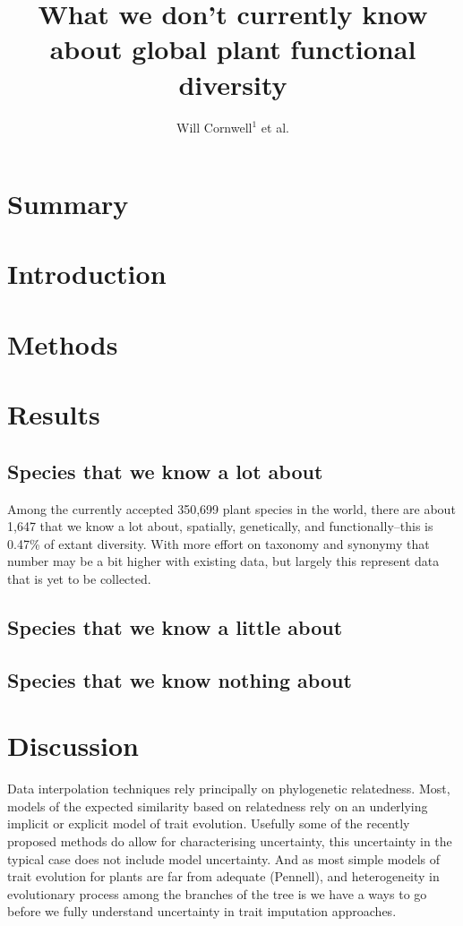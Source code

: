 \documentclass[a4paper,11pt]{article}
\title{What we don't currently know about global plant functional diversity}
\author{
Will Cornwell$^1$
et al.}
\affiliation{
*final list and order undecided\\
$^1$ University of NSW\\
}
\date{}
\begin{document}
\mstitlepage
\noindent

\section{Summary}


\section{Introduction}

\section{Methods}

\section{Results}

\subsection{Species that we know a lot about}

Among the currently accepted 350,699 plant species in the world, there are about 1,647 that we know a lot about, spatially, genetically, and functionally--this is 0.47\% of extant diversity.  With more effort on taxonomy and synonymy that number may be a bit higher with existing data, but largely this represent data that is yet to be collected.

\subsection{Species that we know a little about}

\subsection{Species that we know nothing about}


\section{Discussion}




Data interpolation techniques rely principally on phylogenetic relatedness.  
Most, models of the expected similarity based on relatedness rely on an underlying implicit or explicit model of trait evolution.  
Usefully some of the recently proposed methods do allow for characterising uncertainty, this uncertainty in the typical case
does not include model uncertainty.  And as most simple models of trait evolution for plants are far from adequate (Pennell), and heterogeneity in evolutionary 
process among the branches of the tree is 
we have a ways to go before we fully understand uncertainty in trait imputation approaches.   
\end{document}
